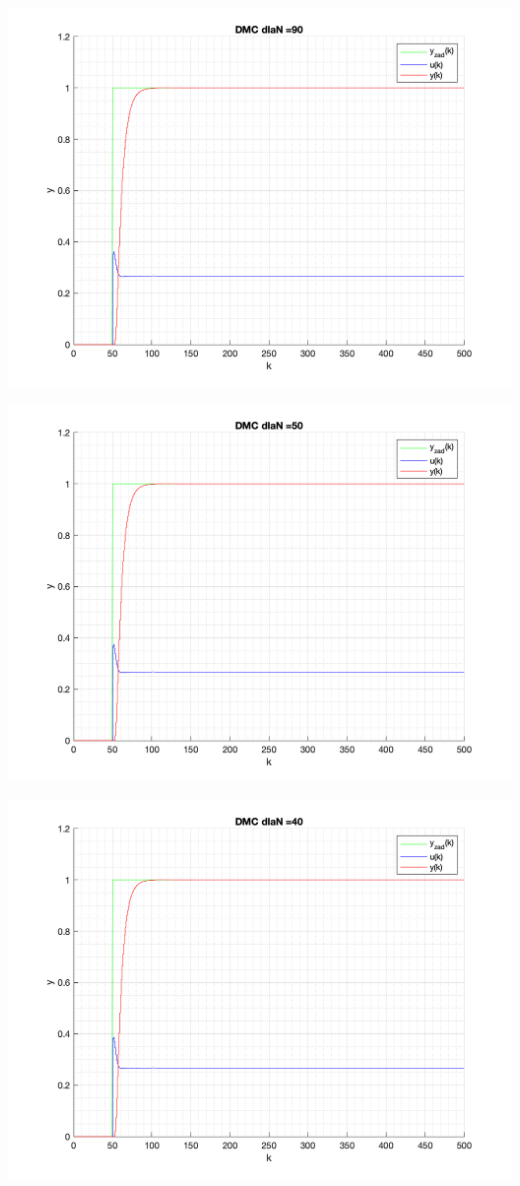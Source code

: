\documentclass[a4paper, 11pt]{article}
\begin{document}
\begin{enumerate}
 \includegraphics[width=\linewidth]{./ModelsP4_N/P4_DMC_N_90_png.png} 
 
 \includegraphics[width=\linewidth]{./ModelsP4_N/P4_DMC_N_50_png.png} 
 
 \includegraphics[width=\linewidth]{./ModelsP4_N/P4_DMC_N_40_png.png} 
 

\end{enumerate}
\end{document}
